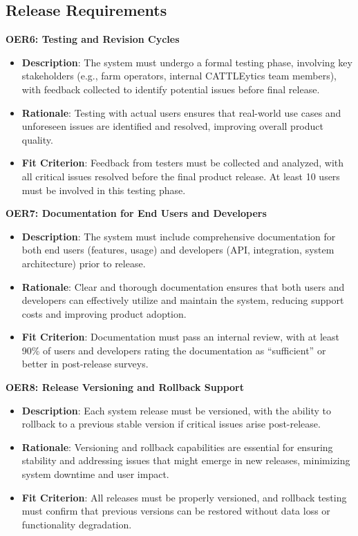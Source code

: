 \documentclass[12pt]{article}
\begin{document}
\subsection{Release Requirements}
\textbf{OER6: Testing and Revision Cycles}
\begin{itemize}
    \item \textbf{Description}: The system must undergo a formal testing phase,
    involving key stakeholders (e.g., farm operators, internal CATTLEytics team
    members), with feedback collected to identify potential issues before final
    release.
    \item \textbf{Rationale}: Testing with actual users ensures that real-world
    use cases and unforeseen issues are identified and resolved, improving
    overall product quality.
    \item \textbf{Fit Criterion}: Feedback from testers must be collected and
    analyzed, with all critical issues resolved before the final product
    release. At least 10 users must be involved in this testing phase.
\end{itemize}
\textbf{OER7: Documentation for End Users and Developers}
\begin{itemize}
    \item \textbf{Description}: The system must include comprehensive
    documentation for both end users (features, usage) and developers (API,
    integration, system architecture) prior to release.
    \item \textbf{Rationale}: Clear and thorough documentation ensures that both
    users and developers can effectively utilize and maintain the system,
    reducing support costs and improving product adoption.
    \item \textbf{Fit Criterion}: Documentation must pass an internal review,
    with at least 90\% of users and developers rating the documentation as
    “sufficient” or better in post-release surveys.
\end{itemize}
\textbf{OER8: Release Versioning and Rollback Support}
\begin{itemize}
    \item \textbf{Description}: Each system release must be versioned, with the
    ability to rollback to a previous stable version if critical issues arise
    post-release.
    \item \textbf{Rationale}: Versioning and rollback capabilities are essential
    for ensuring stability and addressing issues that might emerge in new
    releases, minimizing system downtime and user impact.
    \item \textbf{Fit Criterion}: All releases must be properly versioned, and
    rollback testing must confirm that previous versions can be restored without
    data loss or functionality degradation.
\end{itemize}
\end{document}
